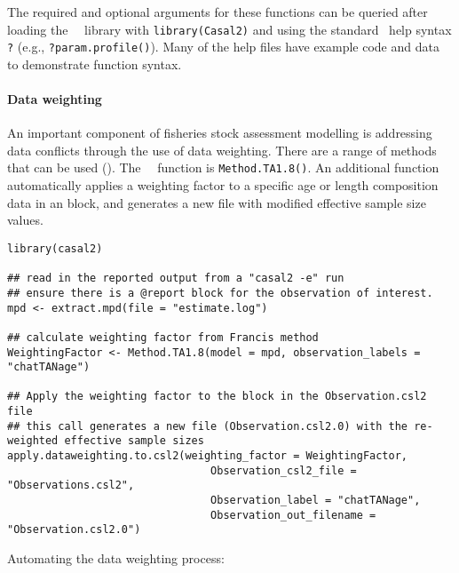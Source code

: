 The required and optional arguments for these functions can be queried after loading the \CNAME\ \R\ library with \texttt{library(Casal2)} and using the standard \R\ help syntax \texttt{?} (e.g., \texttt{?param.profile()}). Many of the help files have example code and data to demonstrate function syntax.

\paragraph*{Data weighting}

An important component of fisheries stock assessment modelling is addressing data conflicts through the use of data weighting. There are a range of methods that can be used (\cite{francis2011data}). The \CNAME\ \R\ function is \texttt{Method.TA1.8()}. An additional function  automatically applies a weighting factor to a specific age or length composition data in an  block, and generates a new  file with modified effective sample size values.

\begin{lstlisting}
library(casal2)

## read in the reported output from a "casal2 -e" run
## ensure there is a @report block for the observation of interest.
mpd <- extract.mpd(file = "estimate.log")

## calculate weighting factor from Francis method
WeightingFactor <- Method.TA1.8(model = mpd, observation_labels = "chatTANage")

## Apply the weighting factor to the block in the Observation.csl2 file
## this call generates a new file (Observation.csl2.0) with the re-weighted effective sample sizes
apply.dataweighting.to.csl2(weighting_factor = WeightingFactor,
                                Observation_csl2_file = "Observations.csl2",
                                Observation_label = "chatTANage",
                                Observation_out_filename = "Observation.csl2.0")
\end{lstlisting}


Automating the data weighting process:


